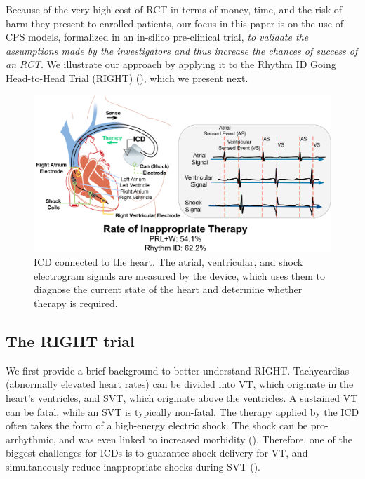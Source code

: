 Because of the very high cost of RCT in terms of money, time, and the risk of harm they present to enrolled patients, our focus in this paper is on the use of CPS models, formalized in an in-silico pre-clinical trial, \emph{to validate the assumptions made by the investigators and thus increase the chances of success of an RCT}.
We illustrate our approach by applying it to the Rhythm ID Going Head-to-Head Trial (RIGHT) (\cite{GoldABBTB11_RIGHTresults}), which we present next.
\begin{figure}[tb]
	\includegraphics[scale=0.6]{figures/figICD.pdf}
	\caption{ICD connected to the heart. The atrial, ventricular, and shock electrogram signals are measured by the device, which uses them to diagnose the current state of the heart and determine whether therapy is required.}
	\label{fig:icd}
\end{figure}

\subsection{The RIGHT trial}
\label{sec:right}
We first provide a brief background to better understand RIGHT. Tachycardias (abnormally elevated heart rates) can be divided into VT, which originate in the heart's ventricles, 
and SVT, which originate above the ventricles.
A sustained VT can be fatal, while an SVT is typically non-fatal.
The therapy applied by the ICD often takes the form of a high-energy electric shock.
The shock can be pro-arrhythmic, and was even linked to increased morbidity (\cite{shock_mortality}).
Therefore, one of the biggest challenges for ICDs is to guarantee shock delivery for VT, and simultaneously reduce inappropriate shocks during SVT (\cite{Ellenbogen11_Pacingbook}).

